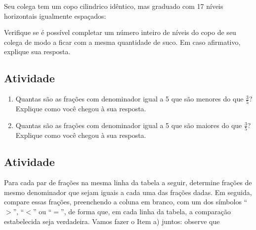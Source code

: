 Seu colega tem um copo cilindrico idêntico, mas graduado com 17 níveis horizontais igualmente espaçados:

\begin{center}
\end{center}

Verifique se é possível completar um número inteiro de níveis do copo de seu colega de modo a ficar com a mesma quantidade de suco. Em caso afirmativo, explique sua resposta.

\subsection{Atividade}

\begin{enumerate} [\quad a)] %
  \item     Quantas são as frações com denominador igual a 5 que são menores do que $\frac{3}{5}$? Explique como você chegou à sua resposta.
  \item     Quantas são as frações com denominador igual a 5 que são maiores do que $\frac{3}{5}$? Explique como você chegou à sua resposta.
\end{enumerate} %

\vspace*{-.5cm}

\subsection{Atividade}

Para cada par de frações na mesma linha da tabela a seguir, determine frações de mesmo denominador que sejam iguais a cada uma das frações dadas. Em seguida, compare essas frações, preenchendo a coluna em branco, com um dos símbolos ``$>$'', ``$<$'' ou ``$=$'', de forma que, em cada linha da tabela, a comparação estabelecida seja verdadeira. Vamos fazer o Item a) juntos: observe que

